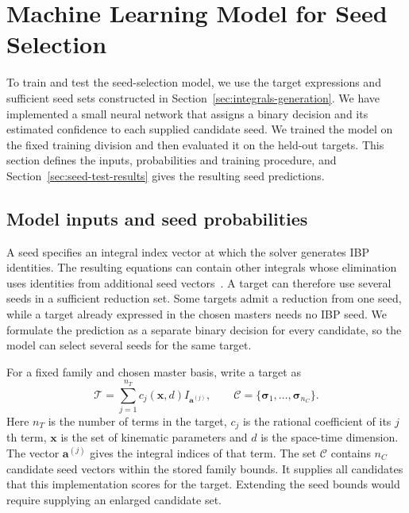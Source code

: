 \section{Machine Learning Model for Seed Selection}
\label{sec:seed-model}
To train and test the seed-selection model, we use the target expressions
and sufficient seed sets constructed in Section~\ref{sec:integrals-generation}.
We have implemented a small neural network that assigns a binary decision and its estimated confidence
to each supplied candidate seed. We trained the model on the fixed training division and then
evaluated it on the held-out targets. This section defines the inputs,
probabilities and training procedure, and
Section~\ref{sec:seed-test-results} gives the resulting seed predictions.

\subsection{Model inputs and seed probabilities}
\label{sec:seed-model-architecture}
A seed specifies an integral index vector at which the solver generates
IBP identities. The resulting equations can contain other integrals whose
elimination uses identities from additional seed vectors~\cite{KiraOriginal}.
A target can therefore use several seeds in a sufficient reduction set.
Some targets admit a reduction from one seed, while a target already
expressed in the chosen masters needs no IBP seed. We formulate the
prediction as a separate binary decision for every candidate, so the
model can select several seeds for the same target.

For a fixed family and chosen master basis, write a target as
\begin{equation}
 \mathcal T=\sum_{j=1}^{n_T}c_j(\boldsymbol x,d)
                         I_{\boldsymbol a^{(j)}},
 \qquad
 \mathcal C=\{\boldsymbol\sigma_1,\ldots,
                          \boldsymbol\sigma_{n_C}\}.
 \label{eq:seed-model-input}
\end{equation}
Here $n_T$ is the number of terms in the target, $c_j$ is the
rational coefficient of its $j$th term, $\boldsymbol x$ is the
set of kinematic parameters and $d$ is the space-time dimension.
The vector $\boldsymbol a^{(j)}$ gives the integral indices of that
term. The set $\mathcal C$ contains $n_C$ candidate seed vectors
within the stored family bounds. It supplies all candidates that
this implementation scores for the target. Extending the seed bounds
would require supplying an enlarged candidate set.

